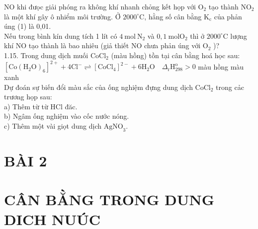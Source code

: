\documentclass[10pt]{article}
\begin{document}
NO khi đưọc giải phóng ra không khí nhanh chỏng kết họp với $\mathrm{O}_{2}$ tạo thành $\mathrm{NO}_{2}$ là một khí gây ô nhiểm môi trường. Ở $2000^{\circ} \mathrm{C}$, hằng số cân bằng $\mathrm{K}_{\mathrm{c}}$ của phản úng (1) là 0,01.\\
Nếu trong bình kín dung tích 1 lít có $4 \mathrm{~mol} \mathrm{~N}_{2}$ và $0,1 \mathrm{~mol} \mathrm{O}_{2}$ thì ở $2000^{\circ} \mathrm{C}$ lượng khí NO tạo thành là bao nhiêu (giả thiết NO chưa phản úng với $\mathrm{O}_{2}$ )?\\
1.15. Trong dung dịch muối $\mathrm{CoCl}_{2}$ (màu hồng) tồn tại cân bằng hoá học sau:\\
$\left[\mathrm{Co}\left(\mathrm{H}_{2} \mathrm{O}\right)_{6}\right]^{2+}+4 \mathrm{Cl}^{-} \rightleftharpoons\left[\mathrm{CoCl}_{4}\right]^{2-}+6 \mathrm{H}_{2} \mathrm{O} \quad \Delta_{\mathrm{r}} \mathrm{H}_{298}^{\mathrm{o}}>0$ màu hồng màu xanh\\
Dự đoán sự biến đổi màu sắc của ống nghiệm đựng dung dịch $\mathrm{CoCl}_{2}$ trong cảc trương họp sau:\\
a) Thêm từ từ HCl đăc.\\
b) Ngâm ống nghiệm vào cốc nước nóng.\\
c) Thêm một vài giọt dung dịch $\mathrm{AgNO}_{3}$.

\section*{BÀI 2}
\section*{CÂN BẰNG TRONG DUNG DICH NUÚC}
\end{document}
